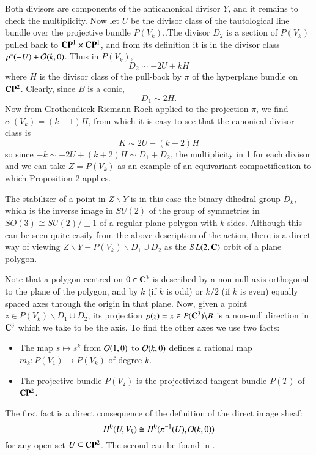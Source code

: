 Both divisors are components of the anticanonical divisor $Y$, and it  remains to check the multiplicity. Now let $U$ be the divisor class of the tautological line bundle over the projective bundle $P(V_{k})$..The divisor $D_{2}$ is a section of $P(V_{k})$ pulled back to $\mathbf{C}\mathbf{P}^{1} \times\mathbf{C}\mathbf{P}^{1}$, and from its definition it is in the divisor class $p^{*}(-U) + \mathcal{O}(k,0)$. Thus in $P(V_{k})$,
\begin{equation}\label{art7-eq-8}
D_{2}\sim -2U + kH
\end{equation}
where $H$ is the divisor class of the pull-back by $\pi$ of the hyperplane bundle on $\mathbf{C}\mathbf{P}^{2}$. Clearly, since $B$ is a conic,
\begin{equation}\label{art7-eq-9}
D_{1} \sim 2H.
\end{equation}
Now from Grothendieck-Riemann-Roch applied to the projection $\pi$, we find $c_{1}(V_{k})=(k-1)H$, from which it is easy to see that the canonical divisor class is
$$
K\sim 2U -(k+2)H
$$
so since $-k\sim -2U +(k+2)H\sim D_{1} + D_{2}$, the multiplicity in 1 for each divisor and we can take $Z =P(V_{k})$ as an example of an equivariant compactification to which Proposition 2 applies.

The stabilizer of a point in $Z\backslash Y$ is in this case the binary dihedral group $\tilde{D_{k}}$, which is the inverse image in $SU(2)$ of the group of symmetries in $SO(3) \cong SU(2)/\pm 1$ of a regular plane polygon  with $k$ sides. Although this can be seen quite easily from the above description of the action, there is a direct way of viewing $Z\backslash Y - P(V_{k})\backslash D_{1}\cup D_{2}$ as the $SL(2, \mathbf{C})$ orbit of a plane polygon.

Note that a polygon centred on $0 \in \mathbf{C}^{3}$ is described by a non-null axis orthogonal to the plane of the polygon, and by $k$ (if $k$ is odd) or $k/2$ (if $k$ is even) equally spaced axes through the origin in that plane. Now, given a point $z\in P(V_{k})\backslash D_{1}\cup D_{2}$, its projection $p(z)= x \in P(\mathbf{C}^{3})\backslash B$ is a non-null direction in $\mathbf{C}^{3}$ which we take to be the axis. To find the other axes we use two facts: 
\begin{itemize}
\item The map $s \mapsto s^{k}$ from $\mathcal{O}(1,0)$ to $\mathcal{O}(k,0)$ defines a rational map $m_{k} : P(V_{1})\rightarrow P(V_{k})$ of degree $k$.
\item The projective bundle $P(V_{2})$ is the projectivized tangent bundle $P(T)$ of $\mathbf{C}\mathbf{P}^{2}$.
\end{itemize}
The first fact is a direct consequence of the definition of the direct image sheaf:
$$
H^{0}(U, V_{k})\cong H^{0}(\pi^{-1}(U), \mathcal{O}(k,0))
$$
for any open set $U \subseteq \mathbf{C}\mathbf{P}^{2}$. The second can be found in \cite{art7-ket16}.

